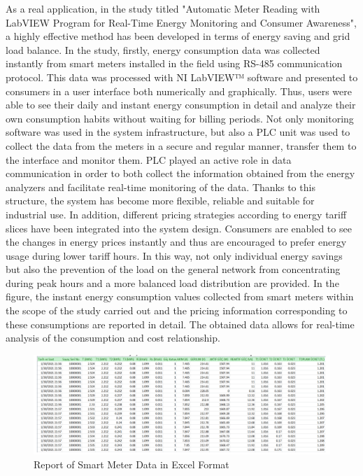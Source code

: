 As a real application, in the study titled "Automatic Meter Reading with LabVIEW Program for Real-Time Energy Monitoring and Consumer Awareness", a highly effective method has been developed in terms of energy saving and grid load balance. In the study, firstly, energy consumption data was collected instantly from smart meters installed in the field using RS-485 communication protocol. This data was processed with NI LabVIEW™ software and presented to consumers in a user interface both numerically and graphically. Thus, users were able to see their daily and instant energy consumption in detail and analyze their own consumption habits without waiting for billing periods. Not only monitoring software was used in the system infrastructure, but also a PLC unit was used to collect the data from the meters in a secure and regular manner, transfer them to the interface and monitor them. PLC played an active role in data communication in order to both collect the information obtained from the energy analyzers and facilitate real-time monitoring of the data. Thanks to this structure, the system has become more flexible, reliable and suitable for industrial use. In addition, different pricing strategies according to energy tariff slices have been integrated into the system design. Consumers are enabled to see the changes in energy prices instantly and thus are encouraged to prefer energy usage during lower tariff hours. In this way, not only individual energy savings but also the prevention of the load on the general network from concentrating during peak hours and a more balanced load distribution are provided. In the figure, the instant energy consumption values ​​collected from smart meters within the scope of the study carried out and the pricing information corresponding to these consumptions are reported in detail. The obtained data allows for real-time analysis of the consumption and cost relationship.



\begin{figure}[H]
    \centering
    \includegraphics[width=0.8\columnwidth]{imgs/Report of Smart Meter Data in Excel Format.png}
    \caption[Short description for list of figures]{Report of Smart Meter Data in Excel Format }
    \label{fig-magnitude}
    \end{figure}%

